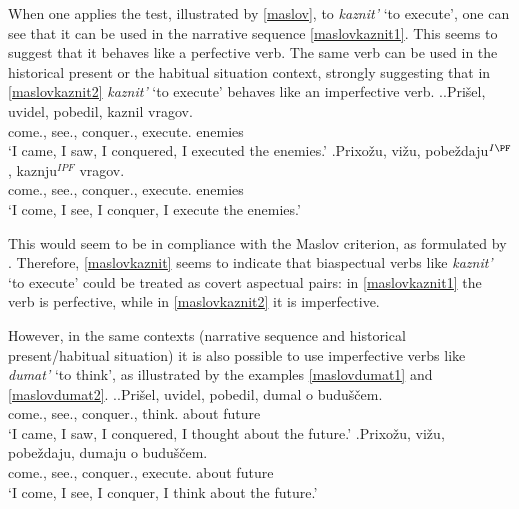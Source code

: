 When one applies the test, illustrated by \ref{maslov}, to \textit{kaznit'} `to execute', one can see that it can be used in the narrative sequence  \ref{maslovkaznit1}. This seems to suggest that it behaves like a perfective verb. The same verb can be used in the historical present or the habitual situation context, strongly suggesting that in \ref{maslovkaznit2} \textit{kaznit'} `to execute' behaves like an imperfective verb.
\ex.\label{maslovkaznit}\ag.\label{maslovkaznit1}Pri\v{s}el\textsuperscript{\PF}, uvidel\textsuperscript{\PF}, pobedil\textsuperscript{\PF}, kaznil\textsuperscript{\PF} vragov.\\
come., see., conquer., execute. enemies\\
\trans `I came, I saw, I conquered, I executed the enemies.'
\bg.\label{maslovkaznit2}Prixo\v{z}u\textsuperscript{\IPF}, vi\v{z}u\textsuperscript{\IPF}, pobe\v{z}daju$^{I{\PF}}$, kaznju$^{IPF}$ vragov.\\
come., see., conquer., execute. enemies\\
\trans `I come, I see, I conquer, I execute the enemies.'

This would seem to be in compliance with the Maslov criterion, as formulated by \citet{Mikaelian:07}. Therefore, \ref{maslovkaznit} seems to indicate that biaspectual verbs like \textit{kaznit'} `to execute' could be treated as covert aspectual pairs: in \ref{maslovkaznit1} the verb is perfective, while in \ref{maslovkaznit2} it is imperfective.

However, in the same contexts (narrative sequence and historical present\slash habitual situation) it is also possible to use imperfective verbs like \textit{dumat'} `to think', as illustrated by the examples \ref{maslovdumat1} and \ref{maslovdumat2}.
\ex.\label{maslovdumat}\ag.\label{maslovdumat1}Pri\v{s}el\textsuperscript{\PF}, uvidel\textsuperscript{\PF}, pobedil\textsuperscript{\PF}, dumal\textsuperscript{\IPF} o budu\v{s}\v{c}em.\\
come., see., conquer., think. about future\\
\trans `I came, I saw, I conquered, I thought about the future.'
\bg.\label{maslovdumat2}Prixo\v{z}u\textsuperscript{\IPF}, vi\v{z}u\textsuperscript{\IPF}, pobe\v{z}daju\textsuperscript{\IPF}, dumaju\textsuperscript{\IPF} o budu\v{s}\v{c}em.\\
come., see., conquer., execute. about future\\
\trans `I come, I see, I conquer, I think about the future.'

